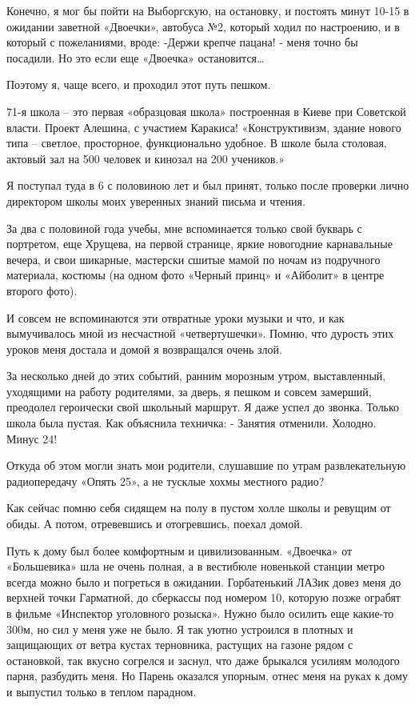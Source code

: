 Конечно, я мог бы пойти на Выборгскую, на остановку, и постоять минут 10-15 в
ожидании заветной «Двоечки», автобуса №2, который ходил по настроению, и в
который с пожеланиями, вроде: -Держи крепче пацана! - меня точно бы посадили.
Но это если еще «Двоечка» остановится… 

Поэтому я, чаще всего, и проходил этот путь пешком.  

71-я школа – это первая «образцовая школа» построенная в Киеве при Советской
власти. Проект Алешина, с участием Каракиса! «Конструктивизм, здание нового
типа – светлое, просторное, функционально удобное. В школе была столовая,
актовый зал на 500 человек и кинозал на 200 учеников.»

Я поступал туда в 6 с половиною лет и был принят, только после проверки лично
директором школы моих уверенных знаний письма и чтения.

За два с половиной года учебы, мне вспоминается только свой букварь с
портретом, еще Хрущева, на первой странице, яркие новогодние карнавальные
вечера, и свои шикарные, мастерски сшитые мамой по ночам из подручного
материала, костюмы (на одном фото «Черный принц» и «Айболит» в центре второго
фото).

И совсем не вспоминаются эти отвратные уроки музыки и что, и как вымучивалось
мной из несчастной «четвертушечки». Помню, что дурость этих уроков меня достала
и домой я возвращался очень злой.

За несколько дней до этих событий, ранним морозным утром, выставленный,
уходящими на работу родителями, за дверь, я пешком и совсем замерший, преодолел
героически свой школьный маршрут. Я даже успел до звонка. Только школа была
пустая. Как объяснила техничка: - Занятия отменили. Холодно. Минус 24! 

Откуда об этом могли знать мои родители, слушавшие по утрам развлекательную
радиопередачу «Опять 25», а не тусклые хохмы местного радио?

Как сейчас помню себя сидящем на полу в пустом холле школы и ревущим от обиды.
А потом, отревевшись и отогревшись, поехал домой. 

Путь к дому был более комфортным и цивилизованным. «Двоечка» от «Большевика»
шла не очень полная, а в вестибюле новенькой станции метро всегда можно было и
погреться в ожидании. Горбатенький ЛАЗик довез меня до верхней точки Гарматной,
до сберкассы под номером 10, которую позже ограбят в фильме «Инспектор
уголовного розыска». Нужно было осилить еще какие-то 300м, но сил у меня уже не
было.  Я так уютно устроился в плотных и защищающих от ветра кустах терновника,
растущих на газоне рядом с остановкой, так вкусно согрелся и заснул, что даже
брыкался усилиям молодого парня, разбудить меня.  Но Парень оказался упорным,
отнес меня на руках к дому и выпустил только в теплом парадном.

